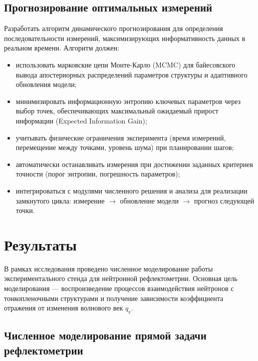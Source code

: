 \documentclass[a4paper]{article}
\begin{document}
\subsection{Прогнозирование оптимальных измерений}
Разработать алгоритм динамического прогнозирования для определения последовательности измерений, максимизирующих информативность данных в реальном времени. Алгоритм должен:
\begin{itemize} 
\item использовать марковские цепи Монте-Карло (MCMC) для байесовского вывода апостериорных распределений параметров структуры и адаптивного обновления модели;
\item минимизировать информационную энтропию ключевых параметров через выбор точек, обеспечивающих максимальный ожидаемый прирост информации (Expected Information Gain);
\item учитывать физические ограничения эксперимента (время измерений, перемещение между точками, уровень шума) при планировании шагов;
\item автоматически останавливать измерения при достижении заданных критериев точности (порог энтропии, погрешность параметров);
\item интегрироваться с модулями численного решения и анализа для реализации замкнутого цикла: измерение $\to$ обновление модели $\to$ прогноз следующей точки.
\end{itemize} %


\bigskip


\section{Результаты}

В рамках исследования проведено численное моделирование работы экспериментального стенда для нейтронной рефлектометрии.
Основная цель моделирования — воспроизведение процессов взаимодействия нейтронов с тонкопленочными структурами и получение зависимости коэффициента отражения от изменения волнового век $q_{\text{z}}$. %

\bigskip


\bigskip

\subsection{Численное моделирование прямой задачи рефлектометрии}
\end{document}
